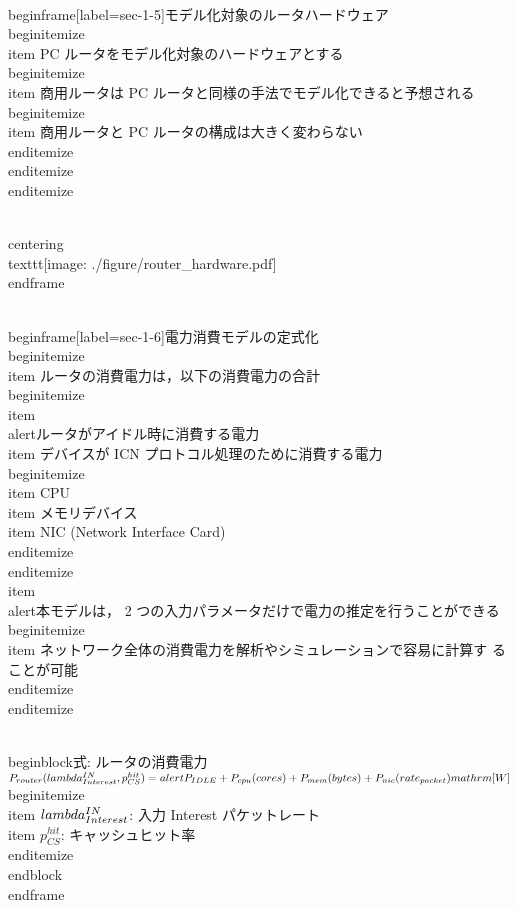 {\\begin{frame}[label=sec-1-5]{モデル化対象のルータハードウェア}
\\begin{itemize}
\\item PC ルータをモデル化対象のハードウェアとする
\\begin{itemize}
\\item 商用ルータは PC ルータと同様の手法でモデル化できると予想される
\\begin{itemize}
\\item 商用ルータと PC ルータの構成は大きく変わらない
\\end{itemize}
\\end{itemize}
\\end{itemize}

\\centering
\\texttt{[image: ./figure/router\_hardware.pdf]}
\\end{frame}

\\begin{frame}[label=sec-1-6]{電力消費モデルの定式化}
\\begin{itemize}
\\item ルータの消費電力は，以下の消費電力の合計
\\begin{itemize}
\\item \\alert{ルータがアイドル時に消費する電力}
\\item デバイスが ICN プロトコル処理のために消費する電力
\\begin{itemize}
\\item CPU
\\item メモリデバイス
\\item NIC (Network Interface Card)
\\end{itemize}
\\end{itemize}
\\item \\alert{本モデルは， 2 つの入力パラメータだけで電力の推定を行うことができる}
\\begin{itemize}
\\item ネットワーク全体の消費電力を解析やシミュレーションで容易に計算す
ることが可能
\\end{itemize}
\\end{itemize}

\\begin{block}{式: ルータの消費電力}%
$P_{router}(\\lambda^{IN}_{Interest}, p^{hit}_{CS}) = \\alert{P_{IDLE}} +
P_{cpu}(cores) + P_{mem}(bytes) + P_{nic}(rate_{packet}) \\mathrm{[W]}$
\\begin{itemize}
\\item $\\lambda^{IN}_{Interest}$: 入力 Interest パケットレート
\\item $p^{hit}_{CS}$: キャッシュヒット率
\\end{itemize}
\\end{block}
\\end{frame}

}
